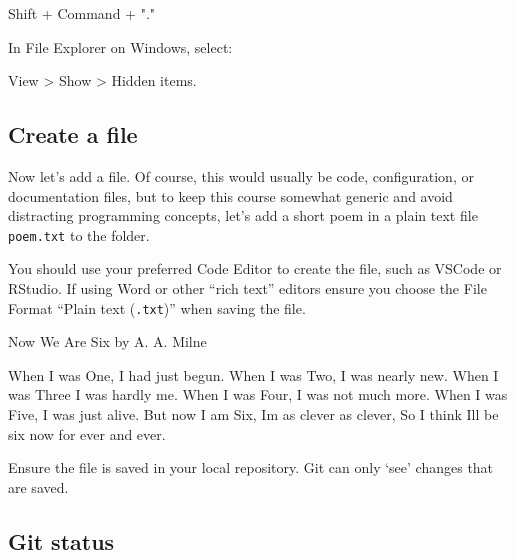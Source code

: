 \documentclass[
  letterpaper,
  DIV=11,
  numbers=noendperiod]{scrartcl}
\newenvironment{Shaded}{\begin{snugshade}}{\end{snugshade}}
\newcommand{\NormalTok}[1]{\textcolor[rgb]{0.00,0.23,0.31}{#1}}
\newcommand{\SpecialCharTok}[1]{\textcolor[rgb]{0.37,0.37,0.37}{#1}}
\newcommand{\StringTok}[1]{\textcolor[rgb]{0.13,0.47,0.30}{#1}}
\begin{document}
\begin{Shaded}
\begin{Highlighting}[]
\NormalTok{Shift }\SpecialCharTok{+}\NormalTok{ Command }\SpecialCharTok{+} \StringTok{"."}
\end{Highlighting}
\end{Shaded}

In File Explorer on Windows, select:

\begin{Shaded}
\begin{Highlighting}[]
\NormalTok{View }\SpecialCharTok{\textgreater{}}\NormalTok{ Show }\SpecialCharTok{\textgreater{}}\NormalTok{ Hidden items.}
\end{Highlighting}
\end{Shaded}

\subsection{Create a file}\label{create-a-file}

Now let's add a file. Of course, this would usually be code,
configuration, or documentation files, but to keep this course somewhat
generic and avoid distracting programming concepts, let's add a short
poem in a plain text file \texttt{poem.txt} to the folder.

You should use your preferred Code Editor to create the file, such as
VSCode or RStudio. If using Word or other ``rich text'' editors ensure
you choose the File Format ``Plain text (\texttt{.txt})'' when saving
the file.

\begin{Shaded}
\begin{Highlighting}[]
\NormalTok{Now We Are Six by A. A. Milne}

\NormalTok{When I was One,}
\NormalTok{I had just begun.}
\NormalTok{When I was Two,}
\NormalTok{I was nearly new.}
\NormalTok{When I was Three}
\NormalTok{I was hardly me.}
\NormalTok{When I was Four,}
\NormalTok{I was not much more.}
\NormalTok{When I was Five,}
\NormalTok{I was just alive.}
\NormalTok{But now I am Six,}
\NormalTok{I\textquotesingle{}m as clever as clever,}
\NormalTok{So I think I\textquotesingle{}ll be six now for ever and ever.}
\end{Highlighting}
\end{Shaded}

Ensure the file is saved in your local repository. Git can only `see'
changes that are saved.

\subsection{Git status}\label{git-status}
\end{document}
